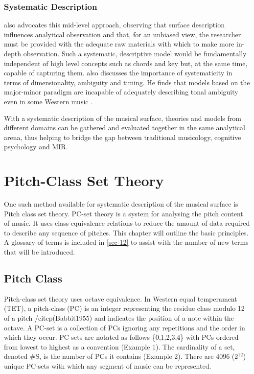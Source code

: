 \documentclass{article}
\begin{document}
\subsubsection{Systematic Description}
\label{sec-2-4-2}

\citet{Martorell2013} also advocates this mid-level approach,
observing that surface description influences analyitcal observation
and that, for an unbiased view, the researcher must be provided with
the adequate raw materials with which to make more in-depth
observation. Such a systematic, descriptive model would be
fundamentally independent of high level concepts such as chords and
key but, at the same time, capable of capturing
them. \citet{Martorell2013} also discusses the importance of
systematicity in terms of dimensionality, ambiguity and timing. He
finds that models based on the major-minor paradigm are incapable of
adequately describing tonal ambiguity even in some Western music
\citep[chap. 3]{Martorell2013}.

With a systematic description of the musical surface, theories and
models from different domains can be gathered and evaluated together in
the same analytical arena, thus helping to bridge the gap between
traditional musicology, cognitive psychology and MIR.
\section{Pitch-Class Set Theory}
\label{sec-3}

One such method available for systematic description of the musical
surface is Pitch class set theory. PC-set theory is a system for
analysing the pitch content of music. It uses class equivalence
relations to reduce the amount of data required to describe any
sequence of pitches. This chapter will outline the basic principles. A
glossary of terms is included in \ref{sec-12} to assist with
the number of new terms that will be introduced.
\subsection{Pitch Class}
\label{sec-3-1}

Pitch-class set theory uses octave equivalence. In Western equal
temperament (TET), a pitch-class (PC) is an integer representing the
residue class modulo 12 of a pitch /citep(Babbit1955) and indicates
the position of a note within the octave. A PC-set is a collection of
PCs ignoring any repetitions and the order in which they
occur. PC-sets are notated as follows \{0,1,2,3,4\} with PCs ordered
from lowest to highest as a convention (Example 1). The cardinality of
a set, denoted \#S, is the number of PCs it contains (Example 2). There
are 4096 (2$^{\mathrm{12}}$) unique PC-sets with which any segment of music can be
represented.
\end{document}
